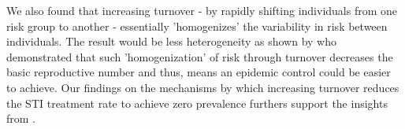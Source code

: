 We also found that increasing turnover - by rapidly shifting individuals from one
risk group to another - essentially 'homogenizes'					%
the variability in risk between individuals.							%
The result would be less heterogeneity as shown by							%
 \citet{Henry2015} who demonstrated that 
such 'homogenization' of risk through turnover								%
decreases the basic reproductive number and thus, means an 
epidemic control could be easier to achieve. 
Our findings on the mechanisms by which increasing turnover			%
reduces the STI treatment rate to achieve zero prevalence 
furthers support the insights from \citet{Henry2015}.

